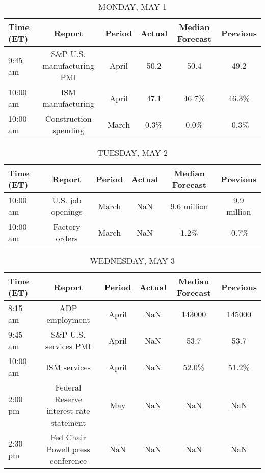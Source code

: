 \documentclass{article}%
\begin{document}
%
\normalsize%


\begin{table}[htbp]%
\caption{MONDAY, MAY 1}%
\centering%
\begin{adjustbox}{width=1\textwidth}%
\begin{tabular}{lccccc}
\toprule
Time (ET) &                     Report & Period & Actual & Median Forecast & Previous \\
\midrule
  9:45 am & S\&P U.S. manufacturing PMI &  April &   50.2 &            50.4 &     49.2 \\
 10:00 am &          ISM manufacturing &  April &   47.1 &           46.7\% &    46.3\% \\
 10:00 am &      Construction spending &  March &   0.3\% &            0.0\% &    -0.3\% \\
\bottomrule
\end{tabular}
%
\end{adjustbox}%
\end{table}

%


\begin{table}[htbp]%
\caption{TUESDAY, MAY 2}%
\centering%
\begin{adjustbox}{width=1\textwidth}%
\begin{tabular}{lccccc}
\toprule
Time (ET) &            Report & Period & Actual & Median Forecast &    Previous \\
\midrule
 10:00 am & U.S. job openings &  March &    NaN &     9.6 million & 9.9 million \\
 10:00 am &    Factory orders &  March &    NaN &            1.2\% &       -0.7\% \\
\bottomrule
\end{tabular}
%
\end{adjustbox}%
\end{table}

%


\begin{table}[htbp]%
\caption{WEDNESDAY, MAY 3}%
\centering%
\begin{adjustbox}{width=1\textwidth}%
\begin{tabular}{lccccc}
\toprule
Time (ET) &                                  Report & Period & Actual & Median Forecast & Previous \\
\midrule
  8:15 am &                          ADP employment &  April &    NaN &          143000 &   145000 \\
  9:45 am &                   S\&P U.S. services PMI &  April &    NaN &            53.7 &     53.7 \\
 10:00 am &                            ISM services &  April &    NaN &           52.0\% &    51.2\% \\
  2:00 pm & Federal Reserve interest-rate statement &    May &    NaN &             NaN &      NaN \\
  2:30 pm &       Fed Chair Powell press conference &    NaN &    NaN &             NaN &      NaN \\
\bottomrule
\end{tabular}
%
\end{adjustbox}%
\end{table}
\end{document}
